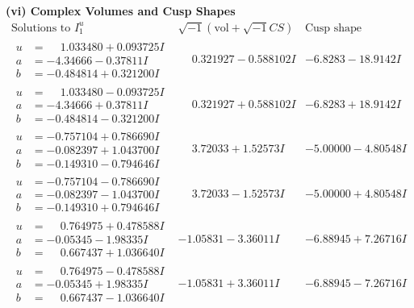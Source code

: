 \documentclass[1p]{elsarticle_modified}
\theoremstyle{definition}
\newcommand{\I}{\sqrt{-1}}
\begin{document}
\newpage\flushleft \textbf{(vi) Complex Volumes and Cusp Shapes}
$$\begin{array}{c|c|c}  
\text{Solutions to }I^u_{1}& \I (\text{vol} + \sqrt{-1}CS) & \text{Cusp shape}\\
 \hline 
\begin{aligned}
u &= \phantom{-}1.033480 + 0.093725 I \\
a &= -4.34666 - 0.37811 I \\
b &= -0.484814 + 0.321200 I\end{aligned}
 & \phantom{-}0.321927 - 0.588102 I & -6.8283 - 18.9142 I \\ \hline\begin{aligned}
u &= \phantom{-}1.033480 - 0.093725 I \\
a &= -4.34666 + 0.37811 I \\
b &= -0.484814 - 0.321200 I\end{aligned}
 & \phantom{-}0.321927 + 0.588102 I & -6.8283 + 18.9142 I \\ \hline\begin{aligned}
u &= -0.757104 + 0.786690 I \\
a &= -0.082397 + 1.043700 I \\
b &= -0.149310 - 0.794646 I\end{aligned}
 & \phantom{-}3.72033 + 1.52573 I & -5.00000 - 4.80548 I \\ \hline\begin{aligned}
u &= -0.757104 - 0.786690 I \\
a &= -0.082397 - 1.043700 I \\
b &= -0.149310 + 0.794646 I\end{aligned}
 & \phantom{-}3.72033 - 1.52573 I & -5.00000 + 4.80548 I \\ \hline\begin{aligned}
u &= \phantom{-}0.764975 + 0.478588 I \\
a &= -0.05345 - 1.98335 I \\
b &= \phantom{-}0.667437 + 1.036640 I\end{aligned}
 & -1.05831 - 3.36011 I & -6.88945 + 7.26716 I \\ \hline\begin{aligned}
u &= \phantom{-}0.764975 - 0.478588 I \\
a &= -0.05345 + 1.98335 I \\
b &= \phantom{-}0.667437 - 1.036640 I\end{aligned}
 & -1.05831 + 3.36011 I & -6.88945 - 7.26716 I \\ \hline\begin{aligned}

\end{aligned}
\end{array}$$
\end{document}
